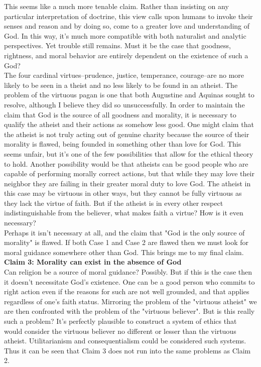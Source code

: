 \documentclass[a4paper, 11pt]{article}
\begin{document}
This seems like a much more tenable claim. Rather than insisting on any particular interpretation of doctrine, this view calls upon humans to invoke their senses and reason and by doing so, come to a greater love and understanding of God. In this way, it's much more compatible with both naturalist and analytic perspectives. Yet trouble still remains. Must it be the case that goodness, rightness, and moral behavior are entirely dependent on the existence of such a God? \\

The four cardinal virtues--prudence, justice, temperance, courage--are no more likely to be seen in a theist and no less likely to be found in an atheist. The problem of the virtuous pagan is one that both Augustine and Aquinas sought to resolve, although I believe they did so unsuccessfully. In order to maintain the claim that God is the source of all goodness and morality, it is necessary to qualify the atheist and their actions as somehow less good. One might claim that the atheist is not truly acting out of genuine charity because the source of their morality is flawed, being founded in something other than love for God. This seems unfair, but it's one of the few possibilities that allow for the ethical theory to hold. Another possibility would be that atheists can be good people who are capable of performing morally correct actions, but that while they may love their neighbor they are failing in their greater moral duty to love God. The atheist in this case may be virtuous in other ways, but they cannot be fully virtuous as they lack the virtue of faith. But if the atheist is in every other respect indistinguishable from the believer, what makes faith a virtue? How is it even necessary? \\

Perhaps it isn't necessary at all, and the claim that "God is the only source of morality" is flawed. If both Case 1 and Case 2 are flawed then we must look for moral guidance somewhere other than God. This brings me to my final claim. \\

\noindent\textbf{Claim 3: Morality can exist in the absence of God} \\

Can religion be a source of moral guidance? Possibly. But if this is the case then it doesn't necessitate God's existence. One can be a good person who commits to right action even if the reasons for such are not well grounded, and that applies regardless of one's faith status. Mirroring the problem of the "virtuous atheist" we are then confronted with the problem of the "virtuous believer". But is this really such a problem? It's perfectly plausible to construct a system of ethics that would consider the virtuous believer no different or lesser than the virtuous atheist. Utilitarianism and consequentialism could be considered such systems. Thus it can be seen that Claim 3 does not run into the same problems as Claim 2. \\
\end{document}
